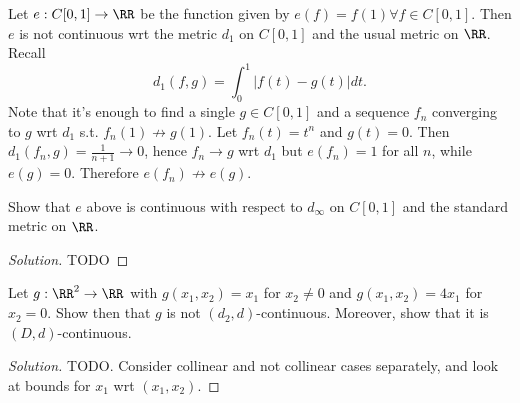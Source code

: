 \begin{example}
  Let $e:C[0,1]\to \RR$ be the function given by $e(f)=f(1) \forall f\in
  C[0,1]$. Then $e$ is not continuous wrt the metric $d_1$ on $C[0,1]$ and the
  usual metric on $\RR$. Recall 
  \[d_1(f,g)= \int_0^1 |f(t)-g(t)|dt.\]
  Note that it's enough to find a single $g\in C[0,1]$ and a sequence $f_n$
  converging to $g$ wrt $d_1$ s.t. $f_n(1)\not\to g(1)$. Let $f_n(t)=t^n$ and
  $g(t)=0$. Then $d_1(f_n,g)=\frac{1}{n+1}\to 0$, hence $f_n\to g$ wrt $d_1$ but
  $e(f_n)=1$ for all $n$, while $e(g)=0$. Therefore $e(f_n)\not\to e(g)$.
\end{example}

\begin{exercise}
  Show that $e$ above is continuous with respect to $d_{\infty}$ on $C[0,1]$ and
  the standard metric on $\RR$.
\end{exercise}
\begin{proof}[Solution]
  TODO
\end{proof}

\begin{exercise}
  Let $g:\RR^2\to\RR$ with $g(x_1,x_2)=x_1$ for $x_2\neq 0$ and
  $g(x_1,x_2)=4x_1$ for $x_2=0$. Show then that $g$ is not
  $(d_2,d)$-continuous. Moreover, show that it is $(D,d)$-continuous.
\end{exercise}
\begin{proof}[Solution]
  TODO. Consider collinear and not collinear cases separately, and look at
  bounds for $x_1$ wrt $(x_1,x_2)$. 
\end{proof}
